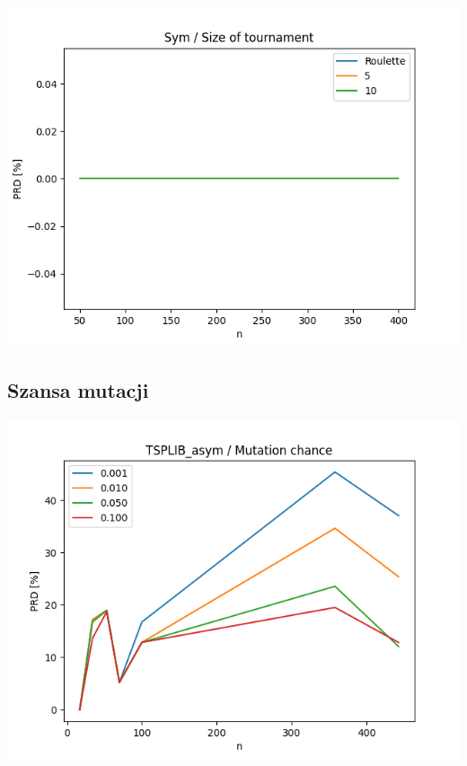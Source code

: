 \documentclass{article}
\begin{document}
\begin{center}
\includegraphics[width=\textwidth, 
                   height = 0.4\textheight, 
                   keepaspectratio]
                  {plots/sym_7_tour} 
\end{center}


\subsection{Szansa mutacji}

\begin{center}
\includegraphics[width=\textwidth, 
                   height = 0.4\textheight, 
                   keepaspectratio]
                  {plots/tsplib_asym_8_mut_chance} 
\end{center}
\end{document}
